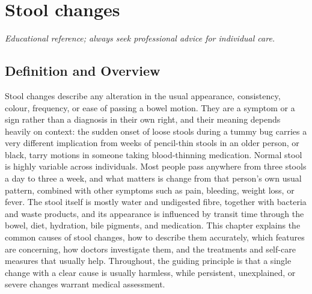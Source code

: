 \chapter{Stool changes}

\medskip
\noindent\textit{Educational reference; always seek professional advice for individual care.}

\section*{Definition and Overview}
Stool changes describe any alteration in the usual appearance, consistency, colour, frequency, or ease of passing a bowel motion. They are a symptom or a sign rather than a diagnosis in their own right, and their meaning depends heavily on context: the sudden onset of loose stools during a tummy bug carries a very different implication from weeks of pencil-thin stools in an older person, or black, tarry motions in someone taking blood-thinning medication. Normal stool is highly variable across individuals. Most people pass anywhere from three stools a day to three a week, and what matters is change from that person's own usual pattern, combined with other symptoms such as pain, bleeding, weight loss, or fever. The stool itself is mostly water and undigested fibre, together with bacteria and waste products, and its appearance is influenced by transit time through the bowel, diet, hydration, bile pigments, and medication. This chapter explains the common causes of stool changes, how to describe them accurately, which features are concerning, how doctors investigate them, and the treatments and self-care measures that usually help. Throughout, the guiding principle is that a single change with a clear cause is usually harmless, while persistent, unexplained, or severe changes warrant medical assessment.

